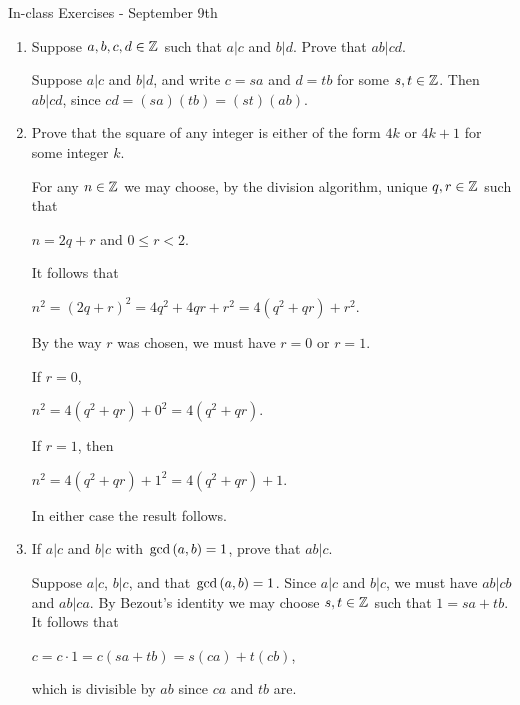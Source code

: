 \documentclass[11pt,fleqn,dvipsnames,usenames]{article}
\renewcommand{\headrulewidth}{1pt}
\newcommand{\p}{\noindent}
\begin{document}
\fancyhead[R]{\term}
\renewcommand{\headrulewidth}{0.4pt}

\begin{center}
\Large{In-class Exercises - September 9th}
\end{center}

\begin{enumerate}
\item Suppose $a,b,c,d\in\mathbb{Z}$ such that $a|c$ and $b|d$.  Prove that $ab|cd$.
\vsmsp

\solution Suppose $a|c$ and $b|d$, and write $c = sa$ and $d = tb$ for some $s,t\in\mathbb{Z}$.  Then $ab|cd$, since $cd = (sa)(tb) = (st)(ab)$.
\item Prove that the square of any integer is either of the form $4k$ or $4k+1$ for some integer $k$.
\vsmsp

\solution For any $n\in\mathbb{Z}$ we may choose, by the division algorithm, unique $q,r\in\mathbb{Z}$ such that
\begin{center}
$n = 2q + r$ and $0\leq r < 2$.
\end{center}

\p It follows that
\begin{center}
$n^2 = (2q+r)^2 = 4q^2 + 4qr + r^2 = 4(q^2 + qr) + r^2$.
\end{center}
By the way $r$ was chosen, we must have $r=0$ or $r=1$.
\vsp

If $r = 0$,
\begin{center}
$n^2 = 4(q^2 + qr) + 0^2 = 4(q^2 + qr)$.
\end{center}
If $r = 1$, then
\begin{center}
$n^2 = 4(q^2 + qr) + 1^2 = 4(q^2 + qr) + 1$.
\end{center}
In either case the result follows.

\item If $a|c$ and $b|c$ with $\text{gcd}\left(a,b\right) = 1$, prove that $ab|c$.\label{abdividesc}
\vsmsp

\solution Suppose $a|c$, $b|c$, and that $\text{gcd}\left(a,b\right) = 1$.  Since $a|c$ and $b|c$, we must have $ab|cb$ and $ab|ca$.  By Bezout's identity we may choose $s,t\in\mathbb{Z}$ such that $1 = sa + tb$.  It follows that
\begin{center}
$c = c\cdot 1 = c(sa + tb) = s(ca) + t(cb)$,
\end{center}
which is divisible by $ab$ since $ca$ and $tb$ are.


\end{enumerate}
\end{document}
